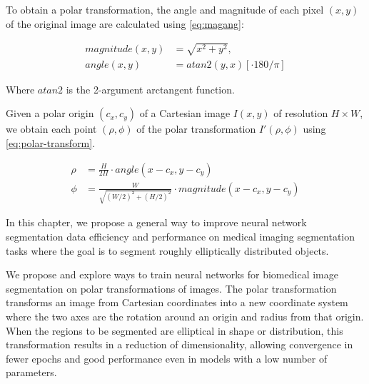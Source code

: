 To obtain a polar 
transformation, the angle and magnitude of each pixel $(x, y)$ of the original image are 
calculated using \eqref{eq:magang}:

  \begin{equation}
    \begin{aligned}
      magnitude(x, y) &= \sqrt{x^2 + y^2} , \\ 
      angle(x, y) &= atan2(y, x) [ \cdot 180 / \pi ]
    \end{aligned}
    \label{eq:magang}
  \end{equation}

Where $atan2$ is the 2-argument arctangent function.

Given a polar origin $(c_x, c_y)$ of a Cartesian image $I(x, y)$ of resolution $H \times W$, we obtain each point $(\rho, \phi)$ of the polar transformation $I'(\rho, \phi)$ using 
\eqref{eq:polar-transform}.

  \begin{equation}
    \begin{aligned}
      \rho &= \frac{H}{2 \Pi} \cdot angle(x - c_x, y - c_y) \\
      \phi &= \frac{W}{\sqrt{(W / 2)^2 + (H / 2)^2}} \cdot magnitude(x - c_x, y - c_y)
    \end{aligned}
    \label{eq:polar-transform}
  \end{equation}


In this chapter, we propose a general way to improve neural network segmentation data efficiency and performance 
on medical imaging segmentation tasks where the goal is to segment roughly 
elliptically distributed objects.

We propose and explore ways to train neural networks for biomedical image segmentation on polar transformations of images. The polar transformation transforms an image from Cartesian coordinates into a new coordinate system where the two
axes are the rotation around an origin and radius from that origin. When the regions to be segmented are elliptical in shape or distribution, this transformation results in a reduction of dimensionality, allowing convergence in fewer epochs and good performance even in models with a low number of parameters. 

